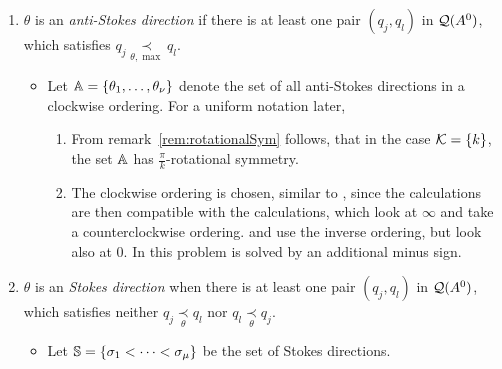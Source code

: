 \begin{defn}
  \label{defn:antiStokesDir}
  \begin{enumerate}
    \item $\theta$ is an \emph{anti-Stokes direction} if there is at least one
      pair $(q_j,q_l)$ in $\cQ(A^0)$, which satisfies
      $q_j \underset{\theta,\max}{\prec} q_l$.
      \begin{itemize}
        \item Let $\A=\{\theta_1,\dots,\theta_{\nu}\}$ denote the set of all
          anti-Stokes directions in a clockwise ordering. For a uniform
          notation later, 
          \begin{s-rem} \label{rem:rotationalSymPrime}
            \begin{enumerate}
              \item From remark~\ref{rem:rotationalSym} follows, that in the
                case $\cK=\{k\}$, the set $\A$ has $\frac{\pi}{k}$-rotational
                symmetry.
              \item The clockwise ordering is chosen, similar to
                \cite{Loday1994}, since the calculations are then compatible
                with the calculations, which look at $\infty$ and take a
                counterclockwise ordering. \cite{boalch} and \cite{thboalch}
                use the inverse ordering, but look also at $0$.
                In \cite{Loday2014} this problem is solved by an additional
                minus sign.
            \end{enumerate}
          \end{s-rem}
      \end{itemize}
    \item $\theta$ is an \emph{Stokes direction} when there is at least one
      pair $(q_j,q_l)$ in $\cQ(A^0)$, which satisfies neither
      $q_j\underset{\theta}{\prec} q_l$ nor $q_l\underset{\theta}{\prec} q_j$.
      \begin{itemize}
        \item Let $\S=\{\sigma_1<\cdots<\sigma_\mu\}$ be the set of Stokes
          directions.
      \end{itemize}
  \end{enumerate}
\end{defn}

